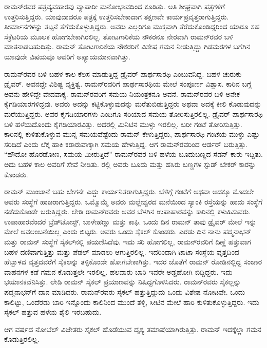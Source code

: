 ರಾಮನ್‍ರವರ ಪತ್ರವ್ಯವಹಾರವು ವ್ಯಾಪಾರೀ ಮನೋಭಾವದಿಂದ ಕೂಡಿತ್ತು. ಅತಿ ಶೀಘ್ರವಾಗಿ ಪತ್ರಗಳಿಗೆ ಉತ್ತರಿಸುತ್ತಿದ್ದರು. ಯಾವುದಾದರೂ ಪತ್ರಕ್ಕೆ ಉತ್ತರಿಸಬೇಕಾದಾಗ ತಕ್ಷಣವೇ ಕಾರ್ಯಪ್ರವೃತ್ತರಾಗುತ್ತಿದ್ದರು. ತೀರ್ಮಾನಗಳನ್ನು ತಟ್ಟನೆ ತೆಗೆದುಕೊಳ್ಳುತ್ತಿದ್ದರು. ಅವರು ಎಲ್ಲರಿಗೂ ಮುಕ್ತವಾಗಿ ತೆರೆದುಕೊಂಡಿದ್ದರಿಂದ ಯಾರೂ ಸಹ ಸೆಕ್ರೆಟರಿಯ ಮೂಲಕ ಹೋಗಬೇಕಾಗಿರಲಿಲ್ಲ. ತೋಟಗಾರಿಕೆಯ ನೌಕರನೂ ನೇರವಾಗಿ ರಾಮನ್‍ರವರ ಬಳಿ ಮಾತನಾಡಬಹುದಿತ್ತು. ರಾಮನ್ ತೋಟಗಾರಿಕೆಯ ನೌಕರರಿಗೆ ವಿಶೇಷ ಗಮನ ನೀಡುತ್ತಿದ್ದು ಗಿಡಮರಗಳ ಬಗೆಗಿನ ಯಾವುದೇ ವಿಷಯವೂ ಅವರಿಗೆ ಅಪ್ಯಾಯಮಾನವಾಗಿತ್ತು.

ರಾಮನ್‍ರವರ ಬಳಿ ಬಹಳ ಕಾಲ ಕೆಲಸ ಮಾಡುತ್ತಿದ್ದ ಡ್ರೈವರ್ ಪಾರ್ಥಸಾರಥಿ ಎಂಬುವನಿದ್ದ. ಬಹಳ ಚುರುಕು ಡ್ರೈವರ್. ಅವನದ್ದೇ ವಿಶಿಷ್ಟ ವ್ಯಕ್ತಿತ್ವ. ರಾಮನ್‍ರವರಿಗೆ ಪಾರ್ಥಸಾರಥಿಯ ಮೇಲೆ ಸಂಪೂರ್ಣ ವಿಶ್ವಾಸ. ಕಾರಿನ ಬಗ್ಗೆ ಅವನು ಹೇಳಿದ್ದೇ ವೇದವಾಕ್ಯ. ರಾಮನ್‍ರವರಿಗೆ ಸಮಯ ನಿಯಂತ್ರಕನೂ ಅವನೆ. ರಾಮನ್‍ರವರ ಬಳಿ ಅನೇಕ ಕೈಗಡಿಯಾರಗಳಿದ್ದವು. ಅವರು ಅದನ್ನು ಕಟ್ಟಿಕೊಳ್ಳುವುದನ್ನು ಮರೆತುಬಿಡುತ್ತಿದ್ದರು ಅಥವಾ ಅದಕ್ಕೆ ಕೀಲಿ ಕೊಡುವುದನ್ನು ಮರೆಯುತ್ತಿದ್ದರು. ಅವರ ಕೈಗಡಿಯಾರಗಳು ಎಂದಿಗೂ ಸರಿಯಾದ ಸಮಯ ತೋರಿಸುತ್ತಿರಲಿಲ್ಲ. ಡ್ರೈವರ್ ಪಾರ್ಥಸಾರಥಿ ಬಳಿ ಹಳೆಯದೊಂದು ಕೈಗಡಿಯಾರವಿತ್ತು. ಅದರಲ್ಲಿ ಮಿನಿಟಿನ ಮುಳ್ಳು ಇರಲಿಲ್ಲ. ಬರೀ ಗಂಟೆ ತೋರಿಸುತ್ತಿತ್ತು. ಕಾರಿನಲ್ಲಿ ಕುಳಿತುಕೊಳ್ಳುವ ಮುನ್ನ ಸಮಯವೆಷ್ಟೆಂದು ರಾಮನ್ ಕೇಳುತ್ತಿದ್ದರು, ಪಾರ್ಥಸಾರಥಿ ಗಂಟೆಯ ಮುಳ್ಳು ಎಷ್ಟು ಸರಿದಿದೆ ಎಂದು ಲೆಕ್ಕ ಹಾಕಿ ಕರಾರುವಾಕ್ಕಾಗಿ ಸಮಯ ಹೇಳುತ್ತಿದ್ದ. ಆಗ ರಾಮನ್‍ರವರಿಂದ ಆರ್ಡರ್ ಬರುತ್ತಿತ್ತು. “ಹೌದೋ ಹೊರಡೋಣ, ಸಮಯ ಮೀರುತ್ತಿದೆ” ರಾಮನ್‍ರವರ ಬಳಿ ಹಳೆಯ ಬೂದುಬಣ್ಣದ ಸೆಡನ್ ಕಾರು ಇದ್ದಿತು. ಅದು ಬಹಳ ಕಾಲ ಅವರಿಗೆ ಸೇವೆ ನೀಡಿತು. ರಲ್ಲಿ ಅವರು ಬೂದು ಮತ್ತು ಹಸಿರು ಬಣ್ಣಗಳ ಸ್ಟುಡ್ ಬೇಕರ್ ಕಾರನ್ನು ಕೊಂಡರು.

ರಾಮನ್ ಮುಂಜಾನೆ ಬಹು ಬೇಗನೇ ಎದ್ದು ಕಾರ್ಯನಿತರಾಗುತ್ತಿದ್ದರು. ಬೆಳಿಗ್ಗೆ  ಗಂಟೆಗೆ ಅಥವಾ ಅದಕ್ಕೂ ಮೊದಲೇ ಅವರು ಸಂಸ್ಥೆಗೆ ಹಾಜರಾಗುತ್ತಿದ್ದರು. ಒಮ್ಮೊಮ್ಮೆ ಅವರು ಮಲ್ಲೇಶ್ವರದ ಮನೆಯಿಂದ ಸ್ಯಾಂಕಿ ರಸ್ತೆಯನ್ನು ಹಾದು ಸಂಸ್ಥೆಗೆ ನಡೆದುಕೊಂಡೇ ಬರುತ್ತಿದ್ದರು. ಲೇಡಿ ರಾಮನ್‍\-ರವರು ಅವರ ಬೆಳಗಿನ ಉಪಾಹಾರವನ್ನು ಕಾರಿನಲ್ಲಿ ಕಳುಹಿಸುವರು. ಉಪಾಹಾರವೆಂದರೆ ಬ್ರೆಡ್‍ಟೋಸ್ಟ್, ಬಾಳೇಹಣ್ಣು ಮತ್ತು ಕಾಫಿ. ಒಂದು ದಿನ ರಾಮನ್ ತಾವು ಡ್ರೈವರ್ ಮೇಲೆ ಇನ್ನು ಮೇಲೆ ಅವಲಂಬನೆಯಿಲ್ಲ ಎಂದು ಬಿಟ್ಟರು. ಅವರು ಒಂದು ಸೈಕಲ್ ಕೊಂಡರು. ಎರಡು ದಿನ ನಾನು ಪದ್ಮನಾಭನ್ ಮತ್ತು ರಾಮನ್ ಸಂಸ್ಥೆಗೆ ಸೈಕಲ್‍ನಲ್ಲಿ ಪಯಣಿಸಿದೆವು. ಇದು ಸರಿ ಹೋಗಲಿಲ್ಲ, ರಾಮನ್‍ರವರಿಗೆ ದಿಣ್ಣೆ ಹತ್ತುವಾಗ ಬಹಳ ದಣಿವಾಗುತ್ತಿತ್ತು ಮತ್ತು ಪೆಡಲ್ ಮಾಡಲು ಆಗುತ್ತಿರಲಿಲ್ಲ. ಇದರಿಂದಾಗಿ ಟಾಟಾ ಸಂಸ್ಥೆಯ ವೃತ್ತದಿಂದ ಹೆಬ್ಬಾಳದ ವೃತ್ತದವರೆಗೆ ಸೈಕಲನ್ನು ತಳ್ಳಿಕೊಂಡೇ ಹೋಗಬೇಕಾಗಿತ್ತು. ಇದರ ಜೊತೆಗೆ ರಾಮನ್ ರೋಡಿನಲ್ಲಿದ್ದ ಸಂಚಾರ ವಾಹನಗಳ ಕಡೆ ಗಮನ ಕೊಡುತ್ತಲೇ ಇರಲಿಲ್ಲ. ಹಲವಾರು ಬಾರಿ ಇವರೇ ಅಡ್ಡಹೋಗಿ ಬಿದ್ದಿದ್ದರು. ಇದು ಭಯಾನಕವೆನಿಸಿತ್ತು. ಲೇಡಿ ರಾಮನ್ ಸೈಕಲ್ ಪ್ರಯಾಣವನ್ನು ನಿಷಿದ್ದಗೊಳಿಸಿದರು. ರಾಮನ್‍ರವರು ಸೈಕಲ್ಲನ್ನು ಪದ್ಮನಾಭನ್‍ಗೆ ದಾನ ಮಾಡಿದರು. ರಾಮನ್‍ರವರು ಸೈಕಲ್ ಹತ್ತುತ್ತಿದ್ದುದು ಒಂದು ವಿಶೇಷ ನೋಟವೇ. ಒಂದು ಕಾಲಿಟ್ಟು, ಒಂದೆರಡು ಬಾರಿ ಇನ್ನೊಂದು ಕಾಲಿನಿಂದ ಮುಂದೆ ತಳ್ಳಿ, ಸೀಟಿನ ಮೇಲೆ ಹಾರಿ ಕುಳಿತುಕೊಳ್ಳುತ್ತಿದ್ದರು. ಇದು ಸೈಕಲ್ ಹತ್ತುವ ಹಳೆಯ ಶೈಲಿ ಇರಬಹುದು.

ಆಗ  ವರ್ಷದ ನೋಬೆಲ್ ವಿಜೇತರು ಸೈಕಲ್ ಹೊಡೆಯುವ ದೃಶ್ಯ ತಮಾಷೆಯಾಗಿರುತ್ತಿತ್ತು. ರಾಮನ್ ಇದಕ್ಕೆಲ್ಲಾ ಗಮನ ಕೊಡುತ್ತಿರಲಿಲ್ಲ.

